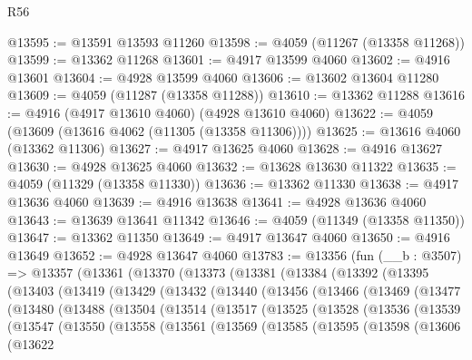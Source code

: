 \begin{lexlean}{R56}
\begin{coremodule}
@13595 := @13591 @13593 @11260
@13598 := @4059 (@11267 (@13358 @11268))
@13599 := @13362 @11268
@13601 := @4917 @13599 @4060
@13602 := @4916 @13601
@13604 := @4928 @13599 @4060
@13606 := @13602 @13604 @11280
@13609 := @4059 (@11287 (@13358 @11288))
@13610 := @13362 @11288
@13616 := @4916 (@4917 @13610 @4060) (@4928 @13610 @4060)
@13622 := @4059 (@13609 (@13616 @4062 (@11305 (@13358 @11306))))
@13625 := @13616 @4060 (@13362 @11306)
@13627 := @4917 @13625 @4060
@13628 := @4916 @13627
@13630 := @4928 @13625 @4060
@13632 := @13628 @13630 @11322
@13635 := @4059 (@11329 (@13358 @11330))
@13636 := @13362 @11330
@13638 := @4917 @13636 @4060
@13639 := @4916 @13638
@13641 := @4928 @13636 @4060
@13643 := @13639 @13641 @11342
@13646 := @4059 (@11349 (@13358 @11350))
@13647 := @13362 @11350
@13649 := @4917 @13647 @4060
@13650 := @4916 @13649
@13652 := @4928 @13647 @4060
@13783 := @13356
    (fun (__b : @3507) =>
    @13357
      (@13361
        (@13370
          (@13373
            (@13381
              (@13384
                (@13392
                  (@13395
                    (@13403
                      (@13419
                        (@13429
                          (@13432
                            (@13440
                              (@13456
                                (@13466
                                  (@13469
                                    (@13477
                                      (@13480
                                        (@13488
                                          (@13504
                                            (@13514
                                              (@13517
                                                (@13525
                                                  (@13528
                                                    (@13536
                                                      (@13539
                                                        (@13547
                                                          (@13550
                                                            (@13558
                                                              (@13561
                                                                (@13569
                                                                  (@13585
                                                                    (@13595
                                                                      (@13598
                                                                        (@13606
                                                                          (@13622

\end{coremodule}
\end{lexlean}
